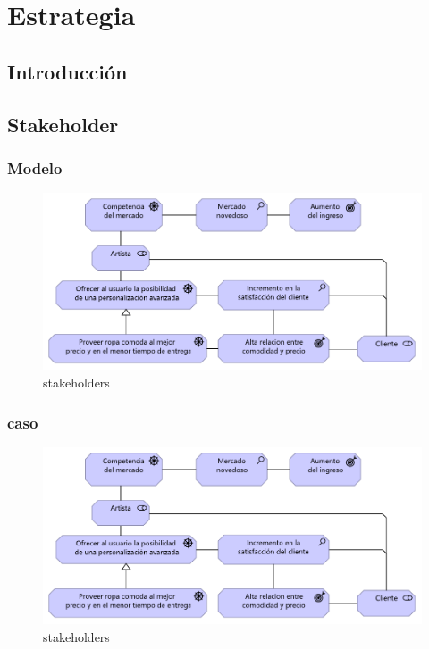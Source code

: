 \graphicspath{{./2-Arquitectura/capitulo4/}}

\chapter{Estrategia}
\section{Introducción}
\newpage
\section{Stakeholder}
\subsection{Modelo}
\begin{figure}[h!]
	\centering
	\includegraphics[width=0.7\linewidth]{imgs/stakeholders}
	\caption{stakeholders}
	\label{fig:stakeholders}
\end{figure}
\newpage
\subsection{caso}
\begin{figure}[h!]
	\centering
	\includegraphics[width=0.7\linewidth]{imgs/stakeholders}
	\caption{stakeholders}
	\label{fig:stakeholders}
\end{figure}
\newpage